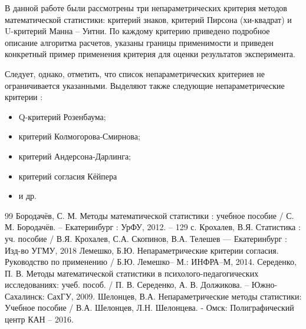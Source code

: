 \documentclass[12pt]{article}
\begin{document}
В данной работе были рассмотрены три непараметрических критерия методов математической статистики: критерий знаков, критерий Пирсона (хи-квадрат) и U-критерий Манна – Уитни. По каждому критерию приведено подробное описание алгоритма расчетов, указаны границы применимости и приведен конкретный пример применения критерия для оценки результатов эксперимента.

Следует, однако, отметить, что список непараметрических критериев не ограничивается указанными. Выделяют также следующие непараметрические критерии \cite{5}:

\begin{itemize}
    \item Q-критерий Розенбаума;
    \item критерий Колмогорова-Смирнова;
    \item критерий Андерсона-Дарлинга;
    \item критерий согласия Кёйпера
    \item и др.
\end{itemize}

\newpage
{}
\begin{thebibliography}{99}
    Бородачёв, С. М. Методы математической статистики : учебное пособие / С. М. Бородачёв. – Екатеринбург : УрФУ, 2012. – 129 с.
    Крохалев, В.Я. Статистика : уч. пособие / В.Я. Крохалев, С.А. Скопинов, В.А. Телешев — Екатеринбург : Изд-во УГМУ, 2018
    Лемешко, Б.Ю. Непараметрические критерии согласия. Руководство по применению / Б.Ю. Лемешко– М.: ИНФРА–М, 2014.
    Середенко, П. В. Методы математической статистики в психолого-педагогических исследованиях: учеб. пособ. / П. В. Середенко, А. В. Должикова. – Южно-Сахалинск: СахГУ, 2009.
    Шелонцев, В.А. Непараметрические методы статистики: Учебное пособие / В.А. Шелонцев, Л.Н. Шелонцева. - Омск: Полиграфический центр КАН – 2016.
\end{thebibliography}
\end{document}
